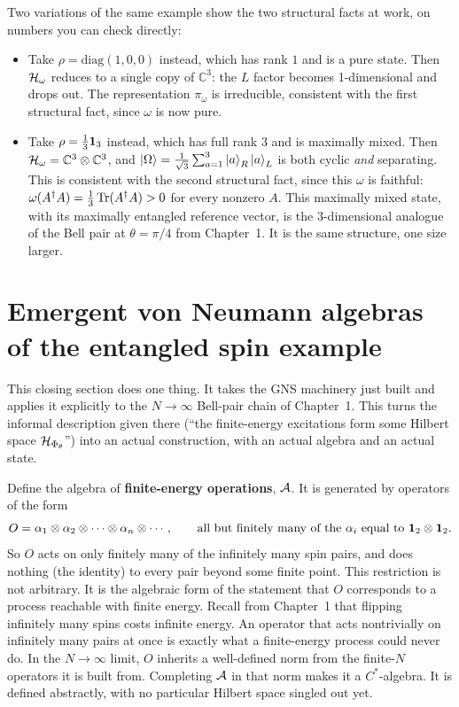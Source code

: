 Two variations of the same example show the two structural facts at work, on numbers you can check directly:
\begin{itemize}
\item Take $\rho=\mathrm{diag}(1,0,0)$ instead, which has rank $1$ and is a pure state. Then $\mathcal{H}_\omega$
reduces to a single copy of $\mathbb C^3$: the $L$ factor becomes 1-dimensional and drops out. The
representation $\pi_\omega$ is irreducible, consistent with the first structural fact, since $\omega$ is now
pure.
\item Take $\rho=\tfrac13\mathbf{1}_3$ instead, which has full rank $3$ and is maximally mixed. Then
$\mathcal{H}_\omega=\mathbb C^3\otimes\mathbb C^3$, and $\ket\Omega=\tfrac1{\sqrt3}\sum_{a=1}^3\ket a_R\ket a_L$ is both
cyclic \emph{and} separating. This is consistent with the second structural fact, since this $\omega$ is
faithful: $\omega(A^\dagger A)=\tfrac13\operatorname{Tr}(A^\dagger A)>0$ for every nonzero $A$. This maximally mixed state, with
its maximally entangled reference vector, is the $3$-dimensional analogue of the Bell pair at $\theta=\pi/4$
from Chapter~1. It is the same structure, one size larger.
\end{itemize}

\section{Emergent von Neumann algebras of the entangled spin example}

This closing section does one thing. It takes the GNS machinery just built and applies it explicitly to the
$N\to\infty$ Bell-pair chain of Chapter~1. This turns the informal description given there (``the
finite-energy excitations form some Hilbert space $\mathcal{H}_{\Phi_\theta}$'') into an actual construction, with an
actual algebra and an actual state.

Define the algebra of \textbf{finite-energy operations}, $\mathcal{A}$. It is generated by operators of the form
\[
O = \alpha_1\otimes\alpha_2\otimes\cdots\otimes\alpha_n\otimes\cdots ,
\qquad \text{all but finitely many of the } \alpha_i \text{ equal to } \mathbf{1}_2\otimes\mathbf{1}_2 .
\]
So $O$ acts on only finitely many of the infinitely many spin pairs, and does nothing (the identity) to every
pair beyond some finite point. This restriction is not arbitrary. It is the algebraic form of the statement
that $O$ corresponds to a process reachable with finite energy. Recall from Chapter~1 that flipping
infinitely many spins costs infinite energy. An operator that acts nontrivially on infinitely many pairs at
once is exactly what a finite-energy process could never do. In the $N\to\infty$ limit, $O$ inherits a
well-defined norm from the finite-$N$ operators it is built from. Completing $\mathcal{A}$ in that norm makes it a
$C^*$-algebra. It is defined abstractly, with no particular Hilbert space singled out yet.

